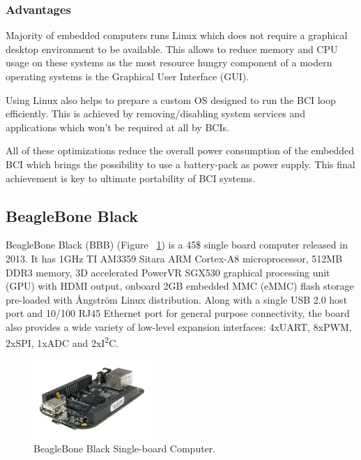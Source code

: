 \documentclass[12pt]{article}
\newcommand\mysubsection[1]{\subsection{#1}}
\newcommand\mysubsubsection[1]{\subsubsection{#1}}
\numberwithin{equation}{section}
\numberwithin{figure}{section}
\numberwithin{table}{section}
\begin{document}
\mysubsubsection{Advantages}\label{seq:embeddedcomputer_advantages}

\par{
Majority of embedded computers runs Linux which does not require a graphical desktop environment
to be available. This allows to reduce memory and CPU usage on these systems as the most resource
hungry component of a modern operating systems is the Graphical User Interface (GUI).
}

\par{
Using Linux also helps to prepare a custom OS designed to run the BCI loop efficiently.
This is achieved by removing/disabling system services and applications which won't be required at all by BCIs.
}

\par{
All of these optimizations reduce the overall power consumption of the embedded BCI which brings
the possibility to use a battery-pack as power supply. This final achievement is key to ultimate
portability of BCI systems.
}

\mysubsection{BeagleBone Black}\label{seq:embeddedcomputer_bbb}

\par{
BeagleBone Black (BBB) (Figure ~\ref{fig:bbb}) is a 45\$ single board computer released in 2013. It has 1GHz TI AM3359 Sitara ARM Cortex-A8 microprocessor,
512MB DDR3 memory, 3D accelerated PowerVR SGX530 graphical processing unit (GPU) with HDMI output, onboard 2GB embedded MMC (eMMC)
flash storage pre-loaded with Ångström Linux distribution. Along with a single USB 2.0 host port and 10/100 RJ45 Ethernet port for
general purpose connectivity, the board also provides a wide variety of low-level expansion interfaces:
4xUART, 8xPWM, 2xSPI, 1xADC and 2xI\textsuperscript{2}C.
}

\begin{figure}[ht]
    \centering
    \includegraphics[width=0.4\textwidth]{images/bbb}
    \caption{BeagleBone Black Single-board Computer.}
    \label{fig:bbb}
\end{figure}
\end{document}
